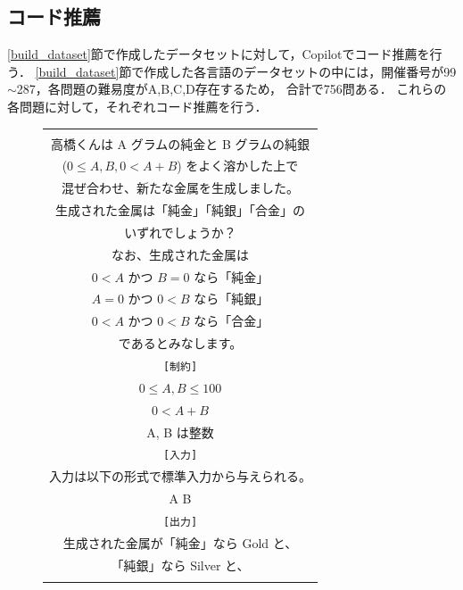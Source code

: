 \vspace{-1zh}
  \subsection{コード推薦\label{recommend_program}}
    \ref{build_dataset}節で作成したデータセットに対して，Copilotでコード推薦を行う．
    \ref{build_dataset}節で作成した各言語のデータセットの中には，開催番号が99${\sim}$287，各問題の難易度がA,B,C,D存在するため，
    合計で756問ある．
    これらの各問題に対して，それぞれコード推薦を行う．
    
    \begin{figure}[t]
      \begin{tabular}{c}
        \begin{tabularx}{23zw}{l}
          \hline
          \verb|[問題文]| \\
          \textrm{  高橋くんは A グラムの純金と B グラムの純銀} \\
          \textrm{  ($0 \leq A, B, 0 < A+B$) をよく溶かした上で} \\
          \textrm{  混ぜ合わせ、新たな金属を生成しました。} \\
          \textrm{  生成された金属は「純金」「純銀」「合金」の} \\
          \textrm{  いずれでしょうか？} \\
          \textrm{  なお、生成された金属は} \\
          \textrm{  $0 < A$ かつ $B = 0$ なら「純金」} \\
          \textrm{  $A = 0$ かつ $0 < B$ なら「純銀」} \\
          \textrm{  $0 < A$ かつ $0 < B$ なら「合金」} \\
          \textrm{  であるとみなします。} \\
          \verb|[制約]| \\
          \textrm{  $0 \leq A,B \leq 100$} \\
          \textrm{  $0 < A+B$} \\
          \textrm{  A, B は整数} \\
          \verb|[入力]| \\
          \textrm{  入力は以下の形式で標準入力から与えられる。} \\
          \textrm{  A B} \\
          \verb|[出力]| \\
          \textrm{  生成された金属が「純金」なら Gold と、} \\
          \textrm{  「純銀」なら Silver と、} \\

\end{tabularx}
\end{tabular}
\end{figure}
